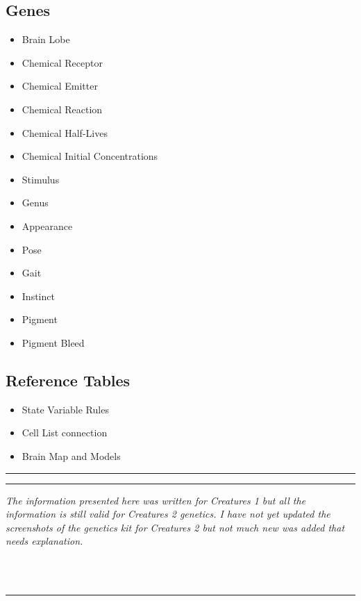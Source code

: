 \documentclass[11pt,twoside,a4paper]{article}
\begin{document}
\begin{minipage}{0.5\linewidth}
			\subsection{Genes}
			\begin{itemize}
				\item Brain Lobe
				\item Chemical Receptor
				\item Chemical Emitter
				\item Chemical Reaction
				\item Chemical Half-Lives
				\item Chemical Initial Concentrations
				\item Stimulus
				\item Genus
				\item Appearance
				\item Pose
				\item Gait
				\item Instinct
				\item Pigment
				\item Pigment Bleed
			\end{itemize}
\end{minipage}
\begin{minipage}{0.1\linewidth}\end{minipage}
\begin{minipage}{0.4\linewidth}
			\subsection{Reference Tables}
			\begin{itemize}
				\item State Variable Rules
				\item Cell List connection %
				\item Brain Map and Models %
			\end{itemize}
			
			\rule{3cm}{0.25mm}
			
			\rule{3cm}{0.25mm}
			
			\emph{The information presented here was written for Creatures 1 but all the information is still valid for Creatures 2 genetics. I have not yet updated the screenshots of the genetics kit for Creatures 2 but not much new was added that needs explanation.}
\end{minipage}
~\\~\\
\rule{10cm}{0.5mm}
\end{document}
